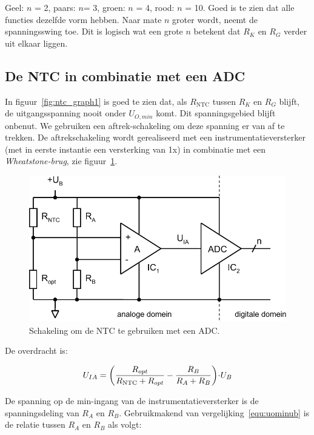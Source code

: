 \documentclass[12pt,a4paper,final,twoside,fleqn]{article}
\newcommand{\rntc}{R_\text{NTC}}
\newcommand{\ropt}{R_{opt}}
\let\oldcdot\cdot
\renewcommand{\cdot}{\kern-.10em\oldcdot\kern-.10em}
\begin{document}
Geel: $n$ = 2, paars: $n $= 3, groen: $n$ = 4, rood: $n$ = 10. Goed is te zien
dat alle functies dezelfde vorm hebben. Naar mate $n$ groter wordt, neemt de
spanningsswing toe. Dit is logisch wat een grote $n$ betekent dat $R_K$ en $R_G$
verder uit elkaar liggen.


\subsection{De NTC in combinatie met een ADC}

In figuur~\ref{fig:ntc_graph1} is goed te zien dat, als $\rntc$ tussen $R_K$ en $R_G$
blijft, de uitgangsspanning nooit onder $U_{O,min}$ komt. Dit spanningsgebied blijft
onbenut. We gebruiken een aftrek-schakeling om deze spanning er van af te trekken. De
aftrekschakeling wordt gerealiseerd met een instrumentatieversterker (met in eerste
instantie een versterking van 1x) in combinatie met een \textsl{Wheatstone-brug}, zie
figuur~\ref{fig:ntc_ampli}.

\begin{figure}[ht!]
\centering
\includegraphics[scale=0.63]{drawings/ntc_ampli}
\caption{Schakeling om de NTC te gebruiken met een ADC.}
\label{fig:ntc_ampli}
\end{figure}


De overdracht is:

\begin{equation}
U_{IA} = \left( \dfrac{\ropt}{\rntc+\ropt} - \dfrac{R_B}{R_A+R_B} \right)\cdot U_B
\end{equation}

De spanning op de min-ingang van de instrumentatieversterker is de spanningsdeling
van $R_A$ en $R_B$. Gebruikmakend van vergelijking~\eqref{equ:uominub} is de relatie
tussen $R_A$ en $R_B$ als volgt:
\end{document}
